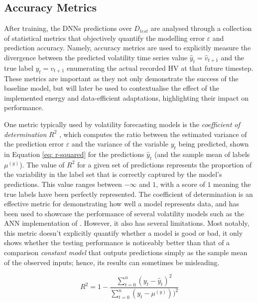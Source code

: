 \documentclass[a4paper, 11pt]{report}
\begin{document}
    \subsection{Accuracy Metrics}
    \label{section: accuracy-metrics}

    After training, the DNNs predictions over $D_{test}$ are analysed through a collection of statistical metrics that objectively quantify the modelling error $\varepsilon$ and prediction accuracy. Namely, accuracy metrics are used to explicitly measure the divergence between the predicted volatility time series value $\hat{y}_t = \hat{v}_{t+1}$ and the true label $y_t = v_{t+1}$ enumerating the actual recorded HV at that future timestep. These metrics are important as they not only demonstrate the success of the baseline model, but will later be used to contextualise the effect of the implemented energy and data-efficient adaptations, highlighting their impact on performance. 

    One metric typically used by volatility forecasting models is the \emph{coefficient of determination} $R^2$ \citep{zhang-2022}, which computes the ratio between the estimated variance of the prediction error $\varepsilon$ and the variance of the variable $y_t$ being predicted, shown in Equation \ref{eq: r-squared} for the predictions $\hat{y}_t$ (and the sample mean of labels $\mu^{(y)}$). The value of $R^2$ for a given set of predictions represents the proportion of the variability in the label set that is correctly captured by the model's predictions. This value ranges between $- \infty$ and $1$, with a score of $1$ meaning the true labels have been perfectly represented. The coefficient of determination is an effective metric for demonstrating how well a model represents data, and has been used to showcase the performance of several volatility models such as the ANN implementation of \citet{zhang-2022}. However, it also has several limitations. Most notably, this metric doesn't explicitly quantify whether a model is good or bad, it only shows whether the testing performance is noticeably better than that of a comparison \emph{constant model} that outputs predictions simply as the sample mean of the observed inputs; hence, its results can sometimes be misleading.


    \begin{equation}
        \label{eq: r-squared}
        R^2 = 1 - \frac{\sum_{t=0}^n (y_t - \hat{y}_t)^2}{\sum_{t=0}^n (y_t - \mu^{(y)}))^2}
    \end{equation}
\end{document}
